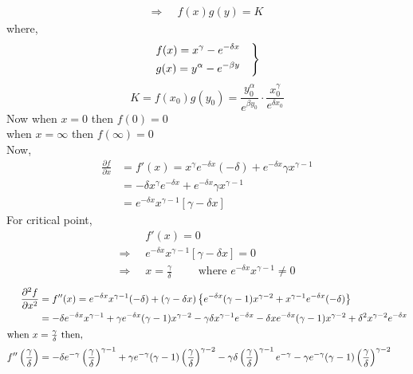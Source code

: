 \documentclass[../main-sheet.tex]{subfiles}
\begin{document}
\begin{soln}
\begin{align*}
        \Rightarrow\;\;& f(x)g(y)=K
    \end{align*}
    where,
    \begin{equation}
        \begin{rcases}
            \displaystyle f(x)=x^\gamma-e^{-\delta x}\quad\\
            \displaystyle g(x)=y^\alpha-e^{-\beta y}
        \end{rcases}
        \label{eq:lotkathm5}
    \end{equation}
    \[K=f(x_0)g(y_0)=\frac{y_0^\alpha}{e^{\beta y_0}}\cdot \frac{x_0^{\gamma }}{e^{\delta x_0}}\]
    Now when \(x=0\) then \(f(0)=0\)\\
     when \(x=\infty\) then \(f(\infty)=0\)\\
     Now,
     \begin{align*}
        \frac{\partial f}{\partial x}&=f'(x)=x^\gamma e^{-\delta x}(-\delta)+e^{-\delta x}\gamma x^{\gamma-1}\\
        &=-\delta x^\gamma e^{-\delta x}+e^{-\delta x}\gamma x^{\gamma-1}\\
        &=e^{-\delta x}x^{\gamma-1} \left[\gamma-\delta x\right]
     \end{align*}
     For critical point,
     \begin{align*}
        &f'(x)=0\\
        \Rightarrow\;\; &e^{-\delta x}x^{\gamma-1} \left[\gamma-\delta x\right]=0\\
        \Rightarrow\;\; &x=\frac{\gamma}{\delta}\qquad\text{ where }e^{-\delta x}x^{\gamma-1}\neq 0
     \end{align*}
     \begin{align*}
        \frac{\partial^2 f}{\partial x^2}&=f''(x)=e^{-\delta x}x^{\gamma -1}(-\delta)+(\gamma-\delta x)\left\{ e^{-\delta x}(\gamma-1)x^{\gamma-2}+x^{\gamma-1}e^{-\delta x}(-\delta) \right\}\\
        &=-\delta e^{-\delta x}x^{\gamma-1}+\gamma e^{-\delta x} (\gamma-1)x^{\gamma-2}-\gamma\delta x^{\gamma-1}e^{-\delta x}-\delta x e^{-\delta x} (\gamma-1) x^{\gamma-2}+\delta^2 x^{\gamma-2}e^{-\delta x}\\
        \intertext{when \(x=\frac{\gamma}{\delta}\) then,}
        f''\left(  \frac{\gamma}{\delta}\right)&=-\delta e^{-\gamma}\left(  \frac{\gamma}{\delta}\right)^{\gamma-1}+\gamma e^{-\gamma} (\gamma-1)\left(  \frac{\gamma}{\delta}\right)^{\gamma-2}-\gamma\delta \left(  \frac{\gamma}{\delta}\right)^{\gamma-1}e^{-\gamma}-\gamma e^{-\gamma} (\gamma-1)\left(  \frac{\gamma}{\delta}\right)^{\gamma-2}\\

\end{align*}
\end{soln}
\end{document}
